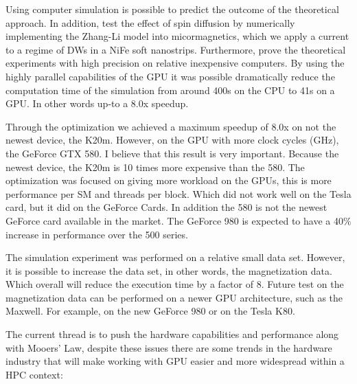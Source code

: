 Using computer simulation is possible to predict the outcome of the theoretical approach. In addition, test the effect of spin diffusion by numerically implementing the Zhang-Li model into micormagnetics, which we apply a current to a regime of DWs in a NiFe soft nanostrips. Furthermore, prove the theoretical experiments with high precision on relative inexpensive computers. By using the highly parallel capabilities of the GPU it was possible dramatically reduce the computation time of the simulation from around 400s on the CPU to 41s on a GPU. In other words up-to a 8.0x speedup.

Through the optimization we achieved a maximum speedup of 8.0x on not the newest device, the K20m. However, on the GPU with more clock cycles (GHz), the GeForce GTX 580. I believe that this result is very important. Because the newest device, the K20m is 10 times more expensive than the 580. The optimization was focused on giving more workload on the GPUs, this is more performance per SM and threads per block. Which did not work well on the Tesla card, but it did on the GeForce Cards. In addition the 580 is not the newest GeForce card available in the market. The GeForce 980 is expected to have a 40$\%$ increase in performance over the 500 series. 

The simulation experiment was performed on a relative small data set. However, it is possible to increase the data set, in other words, the magnetization data. Which overall will reduce the execution time by a factor of 8. Future test on the magnetization data can be performed on a newer GPU architecture, such as the Maxwell. For example, on the new GeForce 980 or on the Tesla K80.

The current thread is to push the hardware capabilities and performance along with Mooers' Law, despite these issues there are some trends in the hardware industry that will make working with GPU easier and more widespread within a HPC context:

